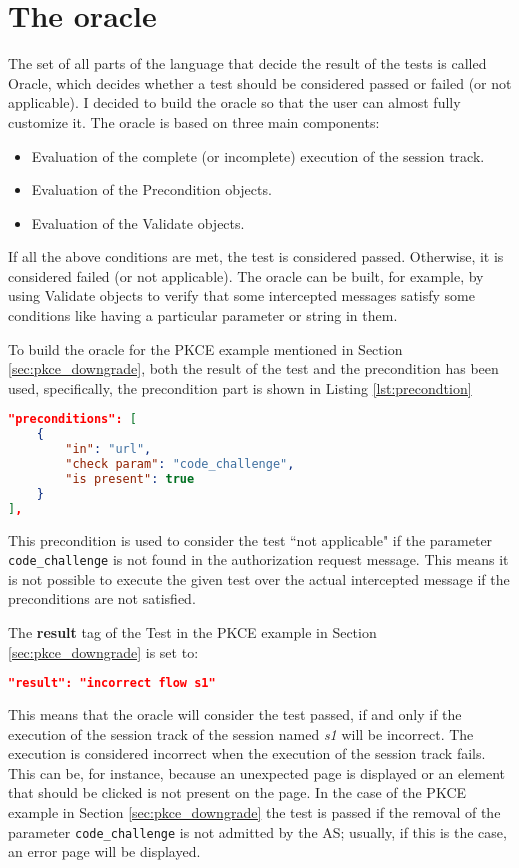\section{The oracle}
The set of all parts of the language that decide the result of the tests is called Oracle,
which decides whether a test should be considered passed or failed (or not applicable). I decided to build the oracle so that the user can almost fully customize it. 
The oracle is based on three main components:
\begin{itemize}
    \item Evaluation of the complete (or incomplete) execution of the \gls{session track}.
    \item Evaluation of the Precondition objects.
    \item Evaluation of the Validate objects.
\end{itemize}
If all the above conditions are met, the test is considered passed. Otherwise, it is considered failed (or not applicable).
The oracle can be built, for example, by using Validate objects to verify that some intercepted messages satisfy some conditions like having a particular parameter or string in them.

To build the oracle for the \gls{PKCE} example mentioned in Section \ref{sec:pkce_downgrade}, both the result of the test and the precondition has been used, specifically, the precondition part is shown in Listing \ref{lst:precondtion}
\begin{lstlisting}[language=json, caption=Precondition definition, label={lst:precondtion}]
"preconditions": [
    {
        "in": "url",
        "check param": "code_challenge",
        "is present": true
    }
],
\end{lstlisting}
This precondition is used to consider the test ``not applicable" if the parameter \texttt{code\_challenge} is not found in the authorization request message. This means it is not possible to execute the given test over the actual intercepted message if the preconditions are not satisfied.

The \textbf{result} tag of the Test in the \gls{PKCE} example in Section \ref{sec:pkce_downgrade} is set to:
\begin{lstlisting}[language=json]
"result": "incorrect flow s1"
\end{lstlisting}
This means that the oracle will consider the test passed, if and only if the execution of the \gls{session track} of the session named \textit{s1} will be incorrect. The execution is considered incorrect when the execution of the \gls{session track} fails. This can be, for instance, because an unexpected page is displayed or an element that should be clicked is not present on the page. In the case of the PKCE example in Section \ref{sec:pkce_downgrade} the test is passed if the removal of the parameter \texttt{code\_challenge} is not admitted by the AS; usually, if this is the case, an error page will be displayed.

